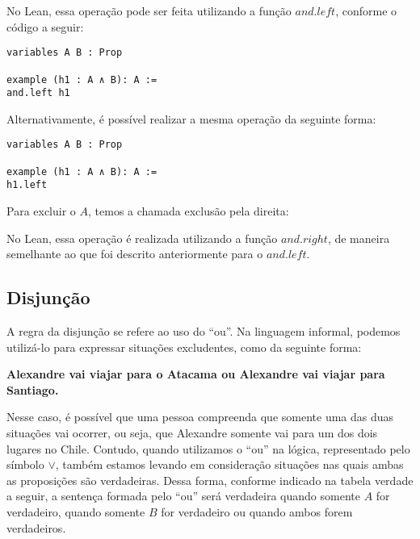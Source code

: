  \begin{prooftree}
\end{prooftree}

No Lean, essa operação pode ser feita utilizando a função $and.left$, conforme o código a seguir: 
\vspace{5mm}
\begin{lstlisting} 
variables A B : Prop

example (h1 : A ∧ B): A :=
and.left h1
\end{lstlisting}
\vspace{5mm}

Alternativamente, é possível realizar a mesma operação da seguinte forma:
\vspace{5mm}
\begin{lstlisting} 
variables A B : Prop

example (h1 : A ∧ B): A :=
h1.left
\end{lstlisting}
\vspace{5mm}
Para excluir o $A$, temos a chamada exclusão pela direita:

 \begin{prooftree}
\end{prooftree}

No Lean, essa operação é realizada utilizando a função $and.right$, de maneira semelhante ao que foi descrito anteriormente para o $and.left$. 

\subsection{Disjunção}

A regra da disjunção se refere ao uso do ``ou''. Na linguagem informal, podemos utilizá-lo para expressar situações excludentes, como da seguinte forma:
\begin{center}
\textbf{Alexandre vai viajar para o Atacama ou Alexandre vai viajar para Santiago.}\\
\end{center}
Nesse caso, é possível que uma pessoa compreenda que somente uma das duas situações vai ocorrer, ou seja, que Alexandre somente vai para um dos dois lugares no Chile. Contudo, quando utilizamos o  ``ou'' na lógica, representado pelo símbolo $\lor$, também estamos levando em consideração situações nas quais ambas as proposições são verdadeiras. Dessa forma, conforme indicado na tabela verdade a seguir, a sentença formada pelo ``ou'' será verdadeira quando somente $A$ for verdadeiro, quando somente $B$ for verdadeiro ou quando ambos forem verdadeiros. 

